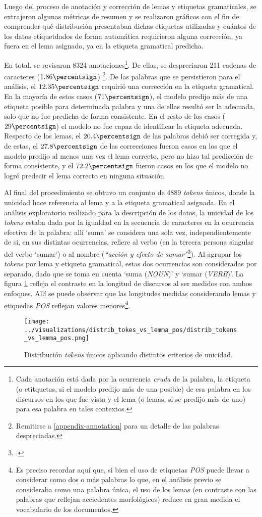 Luego del proceso de anotaci\'on y correcci\'on de lemas y etiquetas gramaticales,
se extrajeron algunas m\'etricas de resumen y se realizaron gr\'aficos con el fin de
comprender qu\'e distribuci\'on presentaban dichas etiquetas utilizadas y cu\'antos de los
datos etiquetdados de forma autom\'atica requirieron alguna correcci\'on, ya fuera en el
lema asignado, ya en la etiqueta gramatical predicha.
\par
En total, se revisaron 8324 anotaciones\footnote{Cada anotaci\'on est\'a dada por
la ocurrencia \textit{cruda} de la palabra, la etiqueta (o etitquetas, si el modelo
predijo m\'as de una posible) de esa palabra en los discursos en los que fue vista y el
lema (o lemas, si se predijo m\'as de uno) para esa palabra en tales contextos.}.
De ellas, se despreciaron 211 cadenas de caracteres ($1.86\percentsign$)
\footnote{Remitirse a \ref{appendix-annotation} para un detalle de las palabras
despreciadas.}. De las palabras que se persistieron para el an\'alisis,
el $12.35\percentsign$ requiri\'o una correcci\'on en la etiqueta gramatical.
En la mayor\'ia de estos casos ($71\percentsign$), el modelo predijo m\'as de una etiqueta
posible para determinada palabra y una de ellas result\'o ser la adecuada, solo que no
fue predicha de forma consistente. En el resto de los casos ($29\percentsign$)
el modelo no fue capaz de identificar la etiqueta adecuada.
Respecto de los lemas, el $20.4\percentsign$ de las palabras debi\'o ser corregida
y, de estas, el $27.8\percentsign$ de las correcciones fueron casos en los que el
modelo predijo al menos una vez el lema correcto, pero no hizo tal predicci\'on de
forma consistente, y el $72.2\percentsign$ fueron casos en los que el modelo
no logr\'o predecir el lema correcto en ninguna situaci\'on.
\par
Al final del procedimiento se obtuvo un conjunto de 4889 \textit{tokens} \'unicos,
donde la unicidad hace referencia al lema y a la etiqueta gramatical asignada.
En el an\'alisis exploratorio realizado para la descripci\'on de los datos, la unicidad
de los \textit{tokens} estaba dada por la igualdad en la secuencia de caracteres
en la ocurrencia efectiva de la palabra: all\'i `suma' se considera
una sola vez, independientemente de si, en sus distintas ocurrencias, refiere al
verbo (en la tercera persona singular del verbo `sumar') o al nombre
(\textit{``acci\'on y efecto de sumar''}\footnote{.}). Al
agrupar los \textit{tokens} por lema y etiqueta gramatical, estas dos
ocurrencias son consideradas por separado, dado que se toma en cuenta
`suma (\textit{NOUN})' y `sumar (\textit{VERB})'. La figura
\ref{fig-distrib-unique-tokens} refleja el contraste en la longitud de
discursos al ser medidos con ambos enfoques. All\'i se puede observar que
las longitudes medidas considerando lemas y etiquedas
\textit{POS} reflejan valores menores\footnote{Es preciso recordar aqu\'i
que, si bien el uso de etiquetas \textit{POS} puede llevar a considerar
como dos o m\'as palabras lo que, en el an\'alisis previo se consideraba
como una palabra \'unica, el uso de los lemas (en contraste con
las palabras que reflejan acciedentes morfol\'ogicos) reduce en gran
medida el vocabulario de los documentos.}.

\begin{figure}[h!]
\centering
\texttt{[image: ../visualizations/distrib\_tokes\_vs\_lemma\_pos/distrib\_tokens\_vs\_lemma\_pos.png]}
\caption{Distribuci\'on \textit{tokens} \'unicos aplicando distintos criterios de unicidad.}
\label{fig-distrib-unique-tokens}
\end{figure}